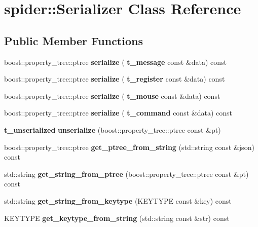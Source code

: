 \section{spider\+:\+:Serializer Class Reference}
\label{classspider_1_1_serializer}
\subsection*{Public Member Functions}
\begin{DoxyCompactItemize}
\item 
\mbox{\label{classspider_1_1_serializer_ad8cbce40137efc7be3cb679a883800f8}} 
boost\+::property\+\_\+tree\+::ptree {\bfseries serialize} (\textbf{ t\+\_\+message} const \&data) const
\item 
\mbox{\label{classspider_1_1_serializer_adca362ee0cd4c86234dd3f85fc62390b}} 
boost\+::property\+\_\+tree\+::ptree {\bfseries serialize} (\textbf{ t\+\_\+register} const \&data) const
\item 
\mbox{\label{classspider_1_1_serializer_a758144d21b9e7334b9a45736095e175f}} 
boost\+::property\+\_\+tree\+::ptree {\bfseries serialize} (\textbf{ t\+\_\+mouse} const \&data) const
\item 
\mbox{\label{classspider_1_1_serializer_a939015316b28fb2ed6021bf6f4ee81df}} 
boost\+::property\+\_\+tree\+::ptree {\bfseries serialize} (\textbf{ t\+\_\+command} const \&data) const
\item 
\mbox{\label{classspider_1_1_serializer_af3bdf08f49c4c9f6111b392264256b7b}} 
\textbf{ t\+\_\+unserialized} {\bfseries unserialize} (boost\+::property\+\_\+tree\+::ptree const \&pt)
\item 
\mbox{\label{classspider_1_1_serializer_a8c998904275aa15bb1b114fe8a82be50}} 
boost\+::property\+\_\+tree\+::ptree {\bfseries get\+\_\+ptree\+\_\+from\+\_\+string} (std\+::string const \&json) const
\item 
\mbox{\label{classspider_1_1_serializer_ab7253d1d906ea8cfc5921a06e9a31263}} 
std\+::string {\bfseries get\+\_\+string\+\_\+from\+\_\+ptree} (boost\+::property\+\_\+tree\+::ptree const \&pt) const
\item 
\mbox{\label{classspider_1_1_serializer_a63becae2837c0f731ee95da9abadcc58}} 
std\+::string {\bfseries get\+\_\+string\+\_\+from\+\_\+keytype} (K\+E\+Y\+T\+Y\+PE const \&key) const
\item 
\mbox{\label{classspider_1_1_serializer_a7cf640d978492cc59889778c108759b0}} 
K\+E\+Y\+T\+Y\+PE {\bfseries get\+\_\+keytype\+\_\+from\+\_\+string} (std\+::string const \&str) const
\end{DoxyCompactItemize}
